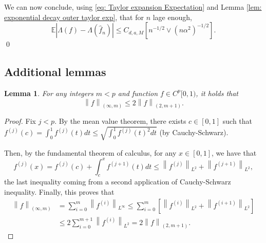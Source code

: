 \documentclass[preprint]{imsart}
\newcommand{\E}{{\mathbb E}}
\newcommand\norm[1]{\left\lVert#1\right\rVert}
\newtheorem{lemma}[theorem]{Lemma}
\numberwithin{equation}{section}
\newcounter{cond}
\begin{document}
\begin{appendix}






We can now conclude, using \eqref{eq: Taylor expansion Expectation} and Lemma \ref{lem: exponential decay outer taylor exp}, that for $n$ lage enough,
\[
\E|\Lambda(f)-\Lambda(\hat{f}_n)|\leq C_{d,a,M}\left[n^{-1/2}\vee(n\alpha^2)^{-1/2}\right].
\]
\hfill\qed






\subsection{Additional lemmas}

\begin{lemma}\label{lem: bound sup by l2}
For any integers $m<p$ and function $f\in C^p[0,1)$, it holds that \[\norm{f}_{(\infty,m)}\leq 2\norm{f}_{(2,m+1)}.\]
\end{lemma}
\begin{proof}
    Fix $j< p$. By the mean value theorem, there exists $c\in[0,1]$ such that $f^{(j)}(c) = \int_0^1 f^{(j)}(t) dt\leq \sqrt{\int_0^1 f^{(j)}(t)^2 dt}$ (by Cauchy-Schwarz).
    
    Then, by the fundamental theorem of calculus, for any $x\in[0,1]$, we have that
\[f^{(j)}(x)=f^{(j)}(c) + \int_c^x f^{(j+1)}(t) dt \leq \norm{f^{(j)}}_{L^2} + \norm{f^{(j+1)}}_{L^2},\]
the last inequality coming from a second application of Cauchy-Schwarz inequality.
Finally, this proves that
\begin{align*}
\norm{f}_{(\infty,m)}&=\sum_{i=0}^m \norm{f^{(i)}}_{L^\infty}\leq \sum_{i=0}^m \left[\norm{f^{(i)}}_{L^2} + \norm{f^{(i+1)}}_{L^2}\right] \\
&\leq 2\sum_{i=0}^{m+1} \norm{f^{(i)}}_{L^2}=2\norm{f}_{(2,m+1)}.
\end{align*}
\end{proof}


\end{appendix}
\end{document}
